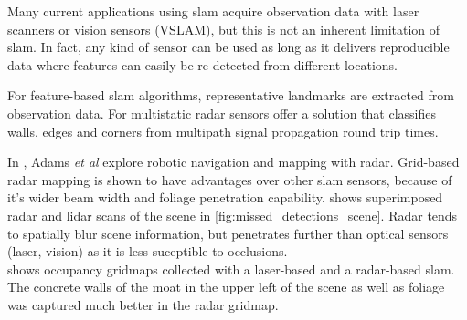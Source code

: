 Many current applications using slam acquire observation data with laser scanners or vision sensors (VSLAM), but this is not an inherent limitation of slam. In fact, any kind of sensor can be used as long as it delivers reproducible data where features can easily be re-detected from different locations.

For feature-based slam algorithms, representative landmarks are extracted from observation data. For multistatic radar sensors \cite{Deissler2013,Deissler2012,Seitz2008,Deissler2009} offer a solution that classifies walls, edges and corners from multipath signal propagation round trip times.

In \cite{Adams2012}, Adams \textit{et al} explore robotic navigation and mapping with radar. Grid-based radar mapping is shown to have advantages over other slam sensors, because of it's wider beam width and foliage penetration capability.  shows superimposed radar and lidar scans of the scene in \cref{fig:missed_detections_scene}. Radar tends to spatially blur scene information, but penetrates further than optical sensors (laser, vision) as it is less suceptible to occlusions.\\
 shows occupancy gridmaps collected with a laser-based and a radar-based slam. The concrete walls of the moat in the upper left of the scene as well as foliage was captured much better in the radar gridmap.

